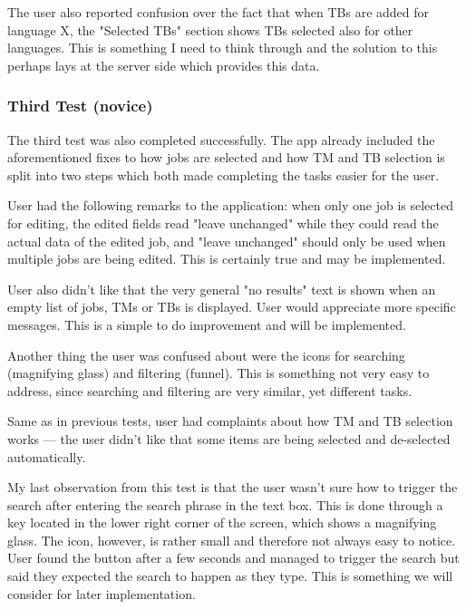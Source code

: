 The user also reported confusion over the fact that when TBs are added for language X, the "Selected TBs" section shows TBs selected also for other languages. This is something I need to think through and the solution to this perhaps lays at the server side which provides this data.


\subsubsection{Third Test (novice)}

The third test was also completed successfully. The app already included the aforementioned fixes to how jobs are selected and how TM and TB selection is split into two steps which both made completing the tasks easier for the user. 

User had the following remarks to the application: when only one job is selected for editing, the edited fields read "leave unchanged" while they could read the actual data of the edited job, and "leave unchanged" should only be used when multiple jobs are being edited. This is certainly true and may be implemented. 

User also didn't like that the very general "no results" text is shown when an empty list of jobs, TMs or TBs is displayed. User would appreciate more specific messages. This is a simple to do improvement and will be implemented.

Another thing the user was confused about were the icons for searching (magnifying glass) and filtering (funnel). This is something not very easy to address, since searching and filtering are very similar, yet different tasks.

Same as in previous tests, user had complaints about how TM and TB selection works --- the user didn't like that some items are being selected and de-selected automatically.

My last observation from this test is that the user wasn't sure how to trigger the search after entering the search phrase in the text box. This is done through a key located in the lower right corner of the screen, which shows a magnifying glass. The icon, however, is rather small and therefore not always easy to notice. User found the button after a few seconds and managed to trigger the search but said they expected the search to happen as they type. This is something we will consider for later implementation.

